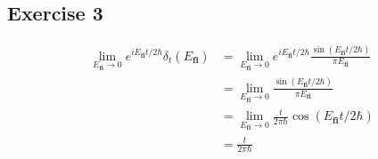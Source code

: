\documentclass[12pt]{article}
\begin{document}
\subsection*{Exercise 3}
\begin{align*}
  \lim_{E_\textbf{fi}\to 0} e^{iE_\textbf{fi}t/2\hbar}\delta_t(E_\textbf{fi}) &= \lim_{E_\textbf{fi}\to 0} e^{iE_\textbf{fi}t/2\hbar}\frac{\sin(E_\textbf{fi}t/2\hbar)}{\pi E_\textbf{fi}} \\
  &= \lim_{E_\textbf{fi}\to 0} \frac{\sin(E_\textbf{fi}t/2\hbar)}{\pi E_\textbf{fi}} \\
  &= \lim_{E_\textbf{fi}\to 0} \frac{t}{2\pi\hbar}\cos(E_\textbf{fi}t/2\hbar) \\
  &= \frac{t}{2\pi\hbar}
\end{align*}
\end{document}
